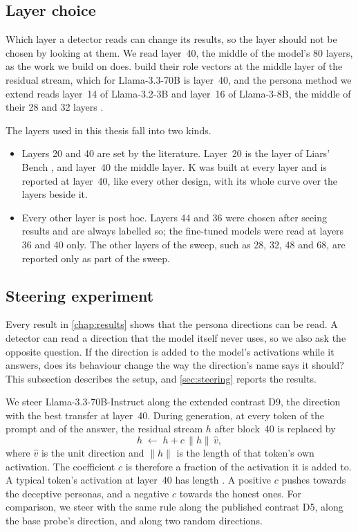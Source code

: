 \subsection{Layer choice}
\label{sec:layer-choice}

Which layer a detector reads can change its results, so the layer should not be chosen by looking at
them. We read layer~40, the middle of the model's 80 layers, as the work we build on does.
\textcite{lu2026assistant} build their role vectors at the middle layer of the residual stream, which
for Llama-3.3-70B is layer~40, and the persona method we extend reads layer~14 of Llama-3.2-3B and
layer~16 of Llama-3-8B, the middle of their 28 and 32 layers \cite{mahadik2026persona}.

The layers used in this thesis fall into two kinds.
\begin{itemize}[leftmargin=1.6em, itemsep=2pt]
\item Layers 20 and 40 are set by the literature. Layer~20 is the layer of Liars' Bench
  \cite{kretschmar2025liars}, and layer~40 the middle layer. K was built at every layer and is
  reported at layer~40, like every other design, with its whole curve over the  layers
  beside it.
\item Every other layer is post hoc. Layers 44 and 36 were chosen after seeing results and are always
  labelled so; the fine-tuned models were read at layers 36 and 40 only. The other layers of the
  sweep, such as 28, 32, 48 and 68, are reported only as part of the sweep.
\end{itemize}

\subsection{Steering experiment}
\label{sec:steering-setup}

Every result in \cref{chap:results} shows that the persona directions can be read. A detector
can read a direction that the model itself never uses, so we also ask the opposite question. If the
direction is added to the model's activations while it answers, does its behaviour change the way the
direction's name says it should? This subsection describes the setup, and \cref{sec:steering}
reports the results.

We steer Llama-3.3-70B-Instruct along the extended contrast D9, the direction with the best transfer
at layer~40. During generation, at every token of the prompt and of the answer, the residual stream
$h$ after block~40 is replaced by
\begin{equation}
  h \;\leftarrow\; h + c\,\lVert h\rVert\,\hat v ,
  \label{eq:steer}
\end{equation}
where $\hat v$ is the unit direction and $\lVert h\rVert$ is the length of that token's own
activation. The coefficient $c$ is therefore a fraction of the activation it is added to. A typical
token's activation at layer~40 has length . A positive $c$ pushes towards the
deceptive personas, and a negative $c$ towards the honest ones. For comparison, we steer with the same
rule along the published contrast D5, along the base probe's direction, and along two random
directions.

